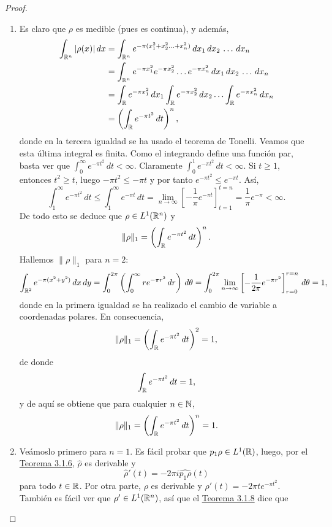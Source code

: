 \documentclass[a4paper, 11pt, oneside]{report}
\begin{document}
\begin{proof}
\hfill
\begin{enumerate}
  \item Es claro que $\rho$ es medible (pues es continua), y además,
  \[\begin{aligned}[t]
    \int_{\mathbb R^n} |\rho(x)| \, dx &= \int_{\mathbb R^n} e^{-\pi(x_1^2+x_2^2\mathellipsis+x_n^2)} \, dx_1 \, dx_2 \, \mathellipsis \, dx_n \\
    &= \int_{\mathbb R^n} e^{-\pi x_1^2}e^{-\pi x_2^2}\mathellipsis e^{-\pi x_n^2} \, dx_1 \, dx_2 \, \mathellipsis \, dx_n \\
    &=  \int_{\mathbb R} e^{-\pi x_1^2} \, dx_1 \int_{\mathbb R} e^{-\pi x_2^2} \, dx_2  \mathellipsis \int_\mathbb R e^{-\pi x_n^2} \, dx_n \\
    &= \left(\int_{\mathbb R} e^{-\pi t^2} \, dt\right)^n,
  \end{aligned}\]
  donde en la tercera igualdad se ha usado el teorema de Tonelli. Veamos que esta última integral es finita. Como el integrando define una función par, basta ver que $\int_0^\infty e^{-\pi t^2}\, dt < \infty$. Claramente $\int_0^1 e^{-\pi t^2} \, dt < \infty$. Si $t \geq 1$, entonces $t^2\geq t$, luego $-\pi t^2 \leq -\pi t$ y por tanto $e^{-\pi t^2} \leq e^{-\pi t}$. Así,
  \[\int_1^\infty e^{-\pi t^2} \, dt \leq \int_1^\infty e^{-\pi t} \, dt = \lim_{n \to \infty} \left[-\frac{1}{\pi}e^{-\pi t}\right]_{t=1}^{t = n} = \frac{1}{\pi}e^{-\pi} < \infty.\]
  De todo esto se deduce que $\rho \in L^1(\mathbb R^n)$ y
  \[\|\rho\|_1 = \left(\int_{\mathbb R} e^{-\pi t^2} \, dt\right)^n.\]
  Hallemos $\|\rho\|_1$ para $n = 2$:
  \[
    \int_{\mathbb R^2} e^{-\pi(x^2+y^2)} \, dx \, dy = \int_0^{2\pi}\left(\int_0^\infty re^{-\pi r^2} \, dr\right) \, d\theta 
    = \int_0^{2\pi} \lim_{n \to \infty} \left[-\frac{1}{2\pi}e^{-\pi r^2}\right]_{r = 0}^{r = n} \, d\theta 
    = 1,\]
  donde en la primera igualdad se ha realizado el cambio de variable a coordenadas polares. En consecuencia,
  \[\|\rho\|_1 = \left(\int_{\mathbb R} e^{-\pi t^2} \, dt\right)^2 = 1,\]
  de donde
  \[\int_{\mathbb R} e^{-\pi t^2} \, dt = 1,\]
  y de aquí se obtiene que para cualquier $n \in \mathbb N$,
  \[\|\rho\|_1 = \left(\int_{\mathbb R} e^{-\pi t^2} \, dt\right)^n = 1.\]
  \item Veámoslo primero para $n = 1$. Es fácil probar que $p_1\rho \in L^1(\mathbb R)$, luego, por el \hyperref[teo:3.1.6]{\color{c1}Teorema 3.1.6}, $\widehat{\rho}$ es derivable y
  \[\widehat{\rho}'(t) = -2\pi i \widehat{ p_1\rho}(t) \tag{$\ast$}\]
  para todo $t \in \mathbb R$. Por otra parte, $\rho$ es derivable y $\rho'(t) = -2\pi t e^{-\pi t^2}$. También es fácil ver que $\rho'\in L^1(\mathbb R^n)$, así que el \hyperref[teo:3.1.8]{\color{c1}Teorema 3.1.8} dice que

\end{enumerate}
\end{proof}
\end{document}
